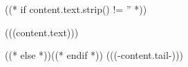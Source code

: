 ((* if content.text.strip() != '' *))\begin{bfseries}(((content.text)))\end{bfseries}((* else *))((* endif *)) (((-content.tail-)))